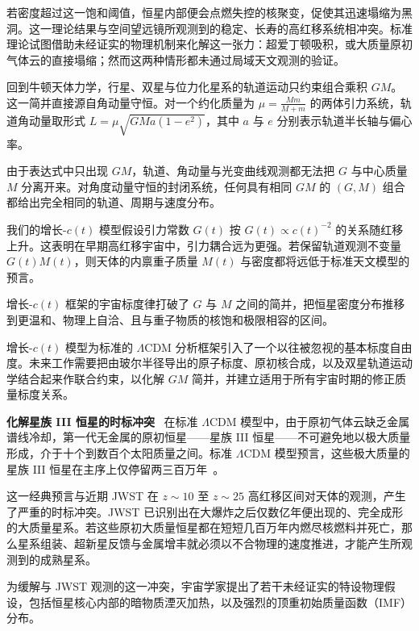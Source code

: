 \documentclass[12pt,leqno]{article}
\begin{document}
	\medskip
	若密度超过这一饱和阈值，恒星内部便会点燃失控的核聚变，促使其迅速塌缩为黑洞。这一理论结果与空间望远镜所观测到的稳定、长寿的高红移系统相冲突。标准理论试图借助未经证实的物理机制来化解这一张力：超爱丁顿吸积，或大质量原初气体云的直接塌缩；然而这两种情形都未通过局域天文观测的验证。
	
	\medskip
	回到牛顿天体力学，行星、双星与位力化星系的轨道运动只约束组合乘积 $GM$。这一简并直接源自角动量守恒。对一个约化质量为 $\mu=\frac{Mm}{M+m}$ 的两体引力系统，轨道角动量取形式 $L=\mu\sqrt{G M a(1-e^2)}$，其中 $a$ 与 $e$ 分别表示轨道半长轴与偏心率。
	
	\medskip
	由于表达式中只出现 $GM$，轨道、角动量与光变曲线观测都无法把 $G$ 与中心质量 $M$ 分离开来。对角度动量守恒的封闭系统，任何具有相同 $GM$ 的 $(G,M)$ 组合都给出完全相同的轨道、周期与速度分布。
	
	\medskip
	我们的增长-$c(t)$ 模型假设引力常数 $G(t)$ 按 $G(t)\propto c(t)^{-2}$ 的关系随红移上升。这表明在早期高红移宇宙中，引力耦合远为更强。若保留轨道观测不变量 $G(t)M(t)$，则天体的内禀重子质量 $M(t)$ 与密度都将远低于标准天文模型的预言。 
	
	\medskip
	增长-$c(t)$ 框架的宇宙标度律打破了 $G$ 与 $M$ 之间的简并，把恒星密度分布推移到更温和、物理上自洽、且与重子物质的核饱和极限相容的区间。
	
	\medskip
	增长-$c(t)$ 模型为标准的 $\Lambda$CDM 分析框架引入了一个以往被忽视的基本标度自由度。未来工作需要把由玻尔半径导出的原子标度、原初核合成，以及双星轨道运动学结合起来作联合约束，以化解 $GM$ 简并，并建立适用于所有宇宙时期的修正质量标度关系。
	
	
	
	
	
	\medskip
	\bigskip
	\textbf{化解星族 III 恒星的时标冲突}\,\,\,
	在标准 $\Lambda$CDM 模型中，由于原初气体云缺乏金属谱线冷却，第一代无金属的原初恒星——星族 III 恒星——不可避免地以极大质量形成，介于十个到数百个太阳质量之间。标准 $\Lambda$CDM 模型预言，这些极大质量的星族 III 恒星在主序上仅停留两三百万年~\cite{Topping:2023}。
	
	\medskip
	这一经典预言与近期 JWST 在 $z\sim10$ 至 $z\sim25$ 高红移区间对天体的观测，产生了严重的时标冲突。JWST 已识别出在大爆炸之后仅数亿年便出现的、完全成形的大质量星系。若这些原初大质量恒星都在短短几百万年内燃尽核燃料并死亡，那么星系组装、超新星反馈与金属增丰就必须以不合物理的速度推进，才能产生所观测到的成熟星系。
	
	\medskip
	为缓解与 JWST 观测的这一冲突，宇宙学家提出了若干未经证实的特设物理假设，包括恒星核心内部的暗物质湮灭加热，以及强烈的顶重初始质量函数（IMF）分布。
	
\end{document}
